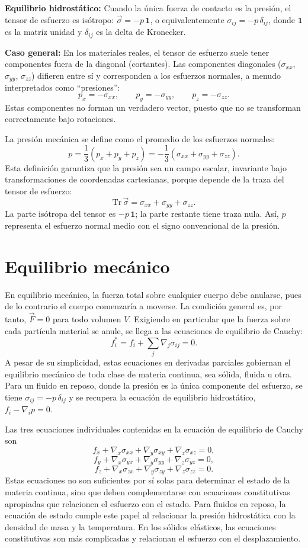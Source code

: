 \textbf{Equilibrio hidrostático:} Cuando la única fuerza de contacto es la presión, el tensor de esfuerzo es isótropo: $\vec{\sigma} = -p\,\mathbf{1}$, o equivalentemente $\sigma_{ij} = -p\,\delta_{ij}$, donde $\mathbf{1}$ es la matriz unidad y $\delta_{ij}$ es la delta de Kronecker.

\textbf{Caso general:} En los materiales reales, el tensor de esfuerzo suele tener componentes fuera de la diagonal (cortantes). Las componentes diagonales ($\sigma_{xx}$, $\sigma_{yy}$, $\sigma_{zz}$) difieren entre sí y corresponden a los esfuerzos normales, a menudo interpretados como ``presiones'':
$$ p_x = -\sigma_{xx}, \qquad p_y = -\sigma_{yy}, \qquad p_z = -\sigma_{zz}. $$
Estas componentes no forman un verdadero vector, puesto que no se transforman correctamente bajo rotaciones.

La presión mecánica se define como el promedio de los esfuerzos normales:
$$ p = \frac{1}{3}(p_x + p_y + p_z) = -\frac{1}{3}(\sigma_{xx} + \sigma_{yy} + \sigma_{zz}). $$
Esta definición garantiza que la presión sea un campo escalar, invariante bajo transformaciones de coordenadas cartesianas, porque depende de la traza del tensor de esfuerzo:
$$ \mathrm{Tr}\,\vec{\sigma} = \sigma_{xx} + \sigma_{yy} + \sigma_{zz}. $$
La parte isótropa del tensor es $-p\,\mathbf{1}$; la parte restante tiene traza nula. Así, $p$ representa el esfuerzo normal medio con el signo convencional de la presión.

\section{Equilibrio mecánico}

En equilibrio mecánico, la fuerza total sobre cualquier cuerpo debe anularse, pues de lo contrario el cuerpo comenzaría a moverse. La condición general es, por tanto, $\vec{F} = 0$ para todo volumen $V$. Exigiendo en particular que la fuerza sobre cada partícula material se anule, se llega a las ecuaciones de equilibrio de Cauchy:
$$ f^*_i = f_i + \sum_j \nabla_j \sigma_{ij} = 0. $$
A pesar de su simplicidad, estas ecuaciones en derivadas parciales gobiernan el equilibrio mecánico de toda clase de materia continua, sea sólida, fluida u otra. Para un fluido en reposo, donde la presión es la única componente del esfuerzo, se tiene $\sigma_{ij} = -p\,\delta_{ij}$ y se recupera la ecuación de equilibrio hidrostático, $f_i - \nabla_i p = 0$.

Las tres ecuaciones individuales contenidas en la ecuación de equilibrio de Cauchy son
$$ f_x + \nabla_x \sigma_{xx} + \nabla_y \sigma_{xy} + \nabla_z \sigma_{xz} = 0, $$
$$ f_y + \nabla_x \sigma_{yx} + \nabla_y \sigma_{yy} + \nabla_z \sigma_{yz} = 0, $$
$$ f_z + \nabla_x \sigma_{zx} + \nabla_y \sigma_{zy} + \nabla_z \sigma_{zz} = 0. $$
Estas ecuaciones no son suficientes por sí solas para determinar el estado de la materia continua, sino que deben complementarse con ecuaciones constitutivas apropiadas que relacionen el esfuerzo con el estado. Para fluidos en reposo, la ecuación de estado cumple este papel al relacionar la presión hidrostática con la densidad de masa y la temperatura. En los sólidos elásticos, las ecuaciones constitutivas son más complicadas y relacionan el esfuerzo con el desplazamiento.

